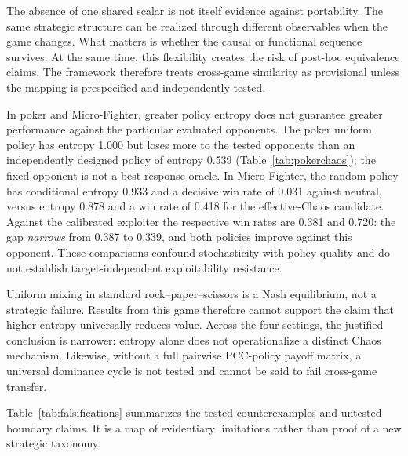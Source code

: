\documentclass[journal]{IEEEtran}
\begin{document}
The absence of one shared scalar is not itself evidence against portability. The same strategic structure can be realized through different observables when the game changes. What matters is whether the causal or functional sequence survives. At the same time, this flexibility creates the risk of post-hoc equivalence claims. The framework therefore treats cross-game similarity as provisional unless the mapping is prespecified and independently tested.

In poker and Micro-Fighter, greater policy entropy does not guarantee greater performance against the particular evaluated opponents. The poker uniform policy has entropy 1.000 but loses more to the tested opponents than an independently designed policy of entropy 0.539 (Table~\ref{tab:pokerchaos}); the fixed opponent is not a best-response oracle. In Micro-Fighter, the random policy has conditional entropy 0.933 and a decisive win rate of 0.031 against neutral, versus entropy 0.878 and a win rate of 0.418 for the effective-Chaos candidate. Against the calibrated exploiter the respective win rates are 0.381 and 0.720: the gap \emph{narrows} from 0.387 to 0.339, and both policies improve against this opponent. These comparisons confound stochasticity with policy quality and do not establish target-independent exploitability resistance.

Uniform mixing in standard rock--paper--scissors is a Nash equilibrium, not a strategic failure. Results from this game therefore cannot support the claim that higher entropy universally reduces value. Across the four settings, the justified conclusion is narrower: entropy alone does not operationalize a distinct Chaos mechanism. Likewise, without a full pairwise PCC-policy payoff matrix, a universal dominance cycle is not tested and cannot be said to fail cross-game transfer.

Table~\ref{tab:falsifications} summarizes the tested counterexamples and untested boundary claims. It is a map of evidentiary limitations rather than proof of a new strategic taxonomy.
\end{document}
